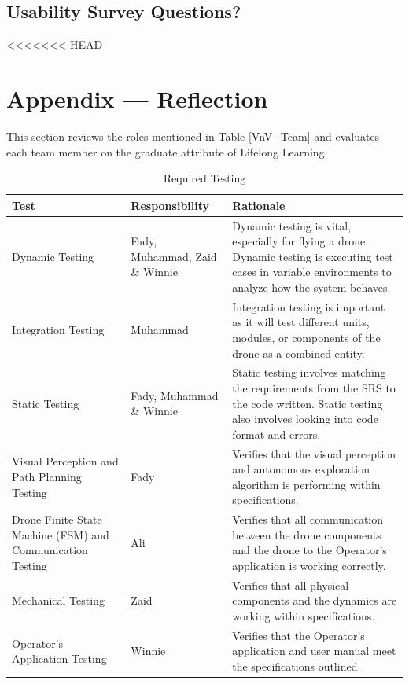 \documentclass[12pt, titlepage]{article}
\begin{document}
\begin{enumerate}
\subsection{Usability Survey Questions?}

\newpage{}
<<<<<<< HEAD
\section{Appendix --- Reflection}
This section reviews the roles mentioned in Table \ref{VnV_Team} and evaluates each team member on the graduate attribute of Lifelong Learning. 

  
\begin{table}[!h]
\begin{center}
\caption {Required Testing}
\label{RequiredTesting}
\begin{tabular}{ | m{3cm} | m{3cm} | m{8cm} | }
\hline
Test & Responsibility & Rationale\\
\hline
Dynamic Testing & Fady, Muhammad, Zaid \& Winnie & Dynamic testing is vital, especially for flying a drone. Dynamic testing is executing test cases in variable environments to analyze how the system behaves.\\
\hline
Integration Testing & Muhammad & Integration testing is important as it will test different units, modules, or components of the drone as a combined entity.\\
\hline
Static Testing & Fady, Muhammad \& Winnie & Static testing involves matching the requirements from the SRS to the code written. Static testing also involves looking into code format and errors. \\
\hline
 Visual Perception and Path Planning Testing & Fady & Verifies that the visual perception and autonomous exploration algorithm is performing within specifications. \\
\hline
Drone Finite State Machine (FSM) and Communication Testing & Ali & Verifies that all communication between the drone components and the drone to the Operator's application is working correctly. \\
\hline
Mechanical Testing & Zaid & Verifies that all physical components and the dynamics are working within specifications. \\
\hline
Operator's Application Testing & Winnie & Verifies that the Operator's application and user manual meet the specifications outlined.
\\
\hline
\end{tabular}
\end{center}
\end{table}


\end{enumerate}
\end{document}
